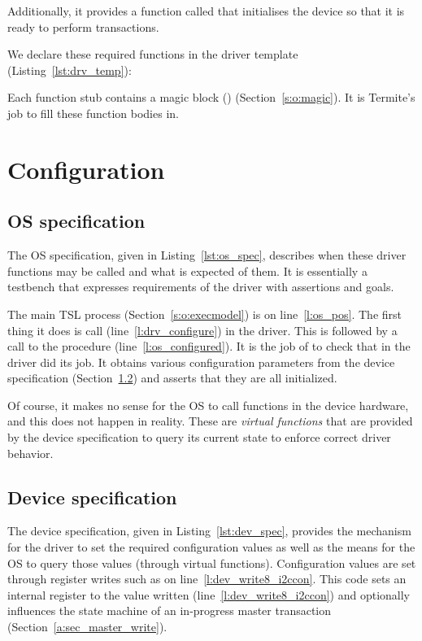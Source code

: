 Additionally, it provides a function called  that initialises the device so that it is ready to perform transactions.

We declare these required functions in the driver template (Listing~\ref{lst:drv_temp}):
\vspace*{5mm}

\vspace*{5mm}

Each function stub contains a magic block () (Section~\ref{s:o:magic}). It is Termite's job to fill these function bodies in.

\section{Configuration}

\subsection{OS specification}

The OS specification, given in Listing~\ref{lst:os_spec}, describes when these driver functions may be called and what is expected of them. It is essentially a testbench that expresses requirements of the driver with assertions and goals.

The main TSL process (Section~\ref{s:o:execmodel}) is on line~\ref{l:os_pos}. The first thing it does is call  (line~\ref{l:drv_configure}) in the driver. This is followed by a call to the procedure  (line~\ref{l:os_configured}). It is the job of  to check that  in the driver did its job. It obtains various configuration parameters from the device specification (Section~\ref{a:sec:dev_spec}) and asserts that they are all initialized. 
        
Of course, it makes no sense for the OS to call functions in the device hardware, and this does not happen in reality. These are \emph{virtual functions} that are provided by the device specification to query its current state to enforce correct driver behavior. 

\subsection{Device specification}
\label{a:sec:dev_spec}

The device specification, given in Listing~\ref{lst:dev_spec}, provides the mechanism for the driver to set the required configuration values as well as the means for the OS to query those values (through virtual functions). Configuration values are set through register writes such as  on line~\ref{l:dev_write8_i2ccon}. This code sets an internal register to the value written (line~\ref{l:dev_write8_i2ccon}) and optionally influences the state machine of an in-progress master transaction (Section~\ref{a:sec_master_write}). 

